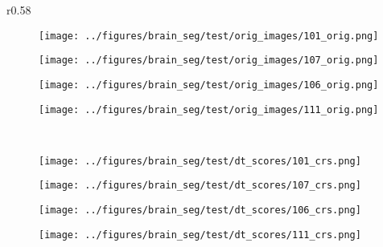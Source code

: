 	\begin{wrapfigure}{r}{0.58\textwidth} %
	\vspace{-0.4cm}
	\captionsetup{width=0.58\textwidth}
	\centering
	\begin{subfigure}{0.14\textwidth}
		\centering
		\texttt{[image: ../figures/brain\_seg/test/orig\_images/101\_orig.png]}
		\label{fig:1}
	\end{subfigure}
	\begin{subfigure}{0.14\textwidth}
		\centering
		\texttt{[image: ../figures/brain\_seg/test/orig\_images/107\_orig.png]}
		\label{fig:2}
	\end{subfigure}
	\begin{subfigure}{0.14\textwidth}
		\centering
		\texttt{[image: ../figures/brain\_seg/test/orig\_images/106\_orig.png]}
		\label{fig:3}
	\end{subfigure}
	\begin{subfigure}{0.14\textwidth}
		\centering
		\texttt{[image: ../figures/brain\_seg/test/orig\_images/111\_orig.png]}
		\label{fig:4}
	\end{subfigure}
	\vspace{-0.75cm}
	\\
	\begin{subfigure}{0.14\textwidth}
		\centering
		\texttt{[image: ../figures/brain\_seg/test/dt\_scores/101\_crs.png]}
		\label{fig:6}
	\end{subfigure}
	\begin{subfigure}{0.14\textwidth}
		\centering
		\texttt{[image: ../figures/brain\_seg/test/dt\_scores/107\_crs.png]}
		\label{fig:7}
	\end{subfigure}
	\begin{subfigure}{0.14\textwidth}
		\centering
		\texttt{[image: ../figures/brain\_seg/test/dt\_scores/106\_crs.png]}
		\label{fig:8}
	\end{subfigure}
	\begin{subfigure}{0.14\textwidth}
		\centering
		\texttt{[image: ../figures/brain\_seg/test/dt\_scores/111\_crs.png]}
		\label{fig:9}
	\end{subfigure}
	\vspace{-0.8cm}
	\caption{}
	\label{fig:brain}
	\vspace{-0.5cm}
\end{wrapfigure}
